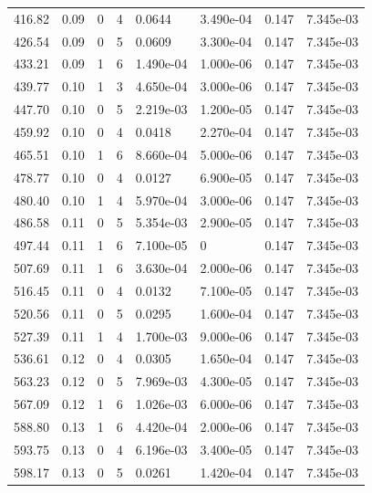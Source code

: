 \documentclass[preview]{standalone}
\begin{document}
{{{\begin{tabular}{L{1.2cm}C{1.2cm} C{0.3cm}C{0.5cm} C{1.4cm}C{1.4cm} C{1.4cm}C{1.4cm}}
  416.82  &  0.09  & 0     &  4 &  0.0644  & 3.490e-04  & 0.147 &  7.345e-03   \\ 
  426.54  &  0.09  & 0     &  5 &  0.0609  & 3.300e-04  & 0.147 &  7.345e-03   \\ 
  433.21  &  0.09  & 1     &  6 &  1.490e-04  & 1.000e-06  & 0.147 &  7.345e-03   \\ 
  439.77  &  0.10  & 1     &  3 &  4.650e-04  & 3.000e-06  & 0.147 &  7.345e-03   \\ 
  447.70  &  0.10  & 0     &  5 &  2.219e-03  & 1.200e-05  & 0.147 &  7.345e-03   \\ 
  459.92  &  0.10  & 0     &  4 &  0.0418  & 2.270e-04  & 0.147 &  7.345e-03   \\ 
  465.51  &  0.10  & 1     &  6 &  8.660e-04  & 5.000e-06  & 0.147 &  7.345e-03   \\ 
  478.77  &  0.10  & 0     &  4 &  0.0127  & 6.900e-05  & 0.147 &  7.345e-03   \\ 
  480.40  &  0.10  & 1     &  4 &  5.970e-04  & 3.000e-06  & 0.147 &  7.345e-03   \\ 
  486.58  &  0.11  & 0     &  5 &  5.354e-03  & 2.900e-05  & 0.147 &  7.345e-03   \\ 
  497.44  &  0.11  & 1     &  6 &  7.100e-05  & 0  & 0.147 &  7.345e-03   \\ 
  507.69  &  0.11  & 1     &  6 &  3.630e-04  & 2.000e-06  & 0.147 &  7.345e-03   \\ 
  516.45  &  0.11  & 0     &  4 &  0.0132  & 7.100e-05  & 0.147 &  7.345e-03   \\ 
  520.56  &  0.11  & 0     &  5 &  0.0295  & 1.600e-04  & 0.147 &  7.345e-03   \\ 
  527.39  &  0.11  & 1     &  4 &  1.700e-03  & 9.000e-06  & 0.147 &  7.345e-03   \\ 
  536.61  &  0.12  & 0     &  4 &  0.0305  & 1.650e-04  & 0.147 &  7.345e-03   \\ 
  563.23  &  0.12  & 0     &  5 &  7.969e-03  & 4.300e-05  & 0.147 &  7.345e-03   \\ 
  567.09  &  0.12  & 1     &  6 &  1.026e-03  & 6.000e-06  & 0.147 &  7.345e-03   \\ 
  588.80  &  0.13  & 1     &  6 &  4.420e-04  & 2.000e-06  & 0.147 &  7.345e-03   \\ 
  593.75  &  0.13  & 0     &  4 &  6.196e-03  & 3.400e-05  & 0.147 &  7.345e-03   \\ 
  598.17  &  0.13  & 0     &  5 &  0.0261  & 1.420e-04  & 0.147 &  7.345e-03   \\ 

\end{tabular}}}}
\end{document}
